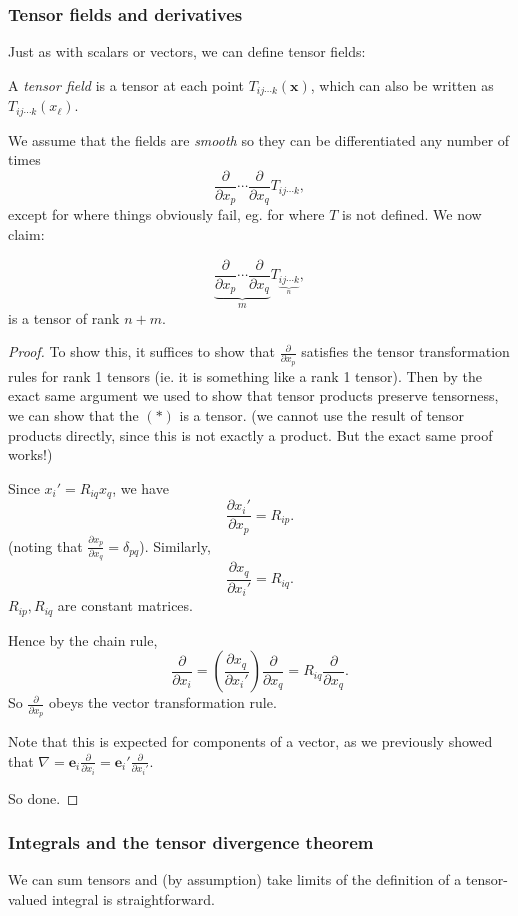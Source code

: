 \documentclass[a4paper]{article}
\begin{document}
\subsubsection{Tensor fields and derivatives}
Just as with scalars or vectors, we can define tensor fields:
\begin{defi}
  A \emph{tensor field} is a tensor at each point $T_{ij\cdots k}(\mathbf{x})$, which can also be written as $T_{ij\cdots k}(x_\ell)$.
\end{defi}

We assume that the fields are \emph{smooth} so they can be differentiated any number of times
\[
  \frac{\partial}{\partial x_p}\cdots \frac{\partial}{\partial x_q}T_{ij\cdots k},
\]
except for where things obviously fail, eg. for where $T$ is not defined. We now claim:
\begin{prop}
  \[
    \underbrace{\frac{\partial}{\partial x_p}\cdots \frac{\partial}{\partial x_q}}_{m}T_{\underbrace{ij\cdots k}_n},\tag{$*$}
  \]
  is a tensor of rank $n + m$.
\end{prop}
\begin{proof}
  To show this, it suffices to show that $\frac{\partial}{\partial x_p}$ satisfies the tensor transformation rules for rank 1 tensors (ie. it is something like a rank 1 tensor). Then by the exact same argument we used to show that tensor products preserve tensorness, we can show that the $(*)$ is a tensor. (we cannot use the result of tensor products directly, since this is not exactly a product. But the exact same proof works!)

  Since $x_i' = R_{iq}x_q$, we have
  \[
    \frac{\partial x_i'}{\partial x_p} = R_{ip}.
  \]
  (noting that $\frac{\partial x_p}{\partial x_q} = \delta_{pq}$). Similarly,
  \[
    \frac{\partial x_q}{\partial x_i'} = R_{iq}.
  \]
  \note $R_{ip}, R_{iq}$ are constant matrices.

  Hence by the chain rule,
  \[
    \frac{\partial}{\partial x_i} = \left(\frac{\partial x_q}{\partial x_i'}\right)\frac{\partial}{\partial x_q} = R_{iq} \frac{\partial}{\partial x_q}.
  \]
  So $\frac{\partial}{\partial x_p}$ obeys the vector transformation rule.

  Note that this is expected for components of a vector, as we previously showed that $\nabla = \mathbf{e}_i \frac{\partial}{\partial x_i} = \mathbf{e}_i' \frac{\partial}{\partial x_i'}$.

  So done.
\end{proof}
\subsubsection{Integrals and the tensor divergence theorem}
We can sum tensors and (by assumption) take limits of the definition of a tensor-valued integral is straightforward.
\end{document}
